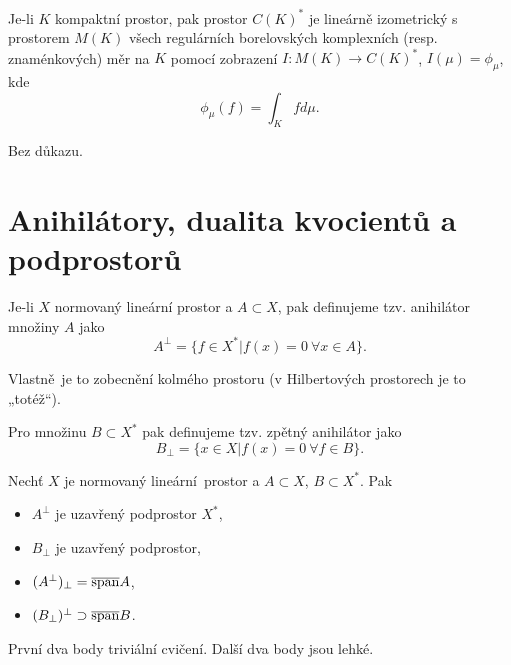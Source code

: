 \documentclass[12pt]{article}					%
\begin{document}
\begin{veta}
	Je-li $K$ kompaktní prostor, pak prostor $C(K)^*$ je lineárně izometrický s prostorem $M(K)$ všech regulárních borelovských komplexních (resp. znaménkových) měr na $K$ pomocí zobrazení $I: M(K) \rightarrow C(K)^*$, $I(\mu) = \phi_\mu$, kde
	$$ \phi_{\mu}(f) = \int_K f d\mu. $$

	\begin{dukazin}
		Bez důkazu.
	\end{dukazin}
\end{veta}

\section{Anihilátory, dualita kvocientů a podprostorů}
\begin{definice}
	Je-li $X$ normovaný lineární prostor a $A \subset X$, pak definujeme tzv. anihilátor množiny $A$ jako
	$$ A^\perp = \{f \in X^* | f(x) = 0\ \forall x \in A\}. $$

	\begin{poznamka}
		Vlastně je to zobecnění kolmého prostoru (v Hilbertových prostorech je to „totéž“).
	\end{poznamka}

	Pro množinu $B \subset X^*$ pak definujeme tzv. zpětný anihilátor jako
	$$ B_\perp = \{x \in X | f(x) = 0\ \forall f \in B\}. $$
\end{definice}

\begin{lemma}
	Nechť $X$ je normovaný lineární prostor a $A \subset X$, $B \subset X^*$. Pak

	\begin{itemize}
		\item $A^\perp$ je uzavřený podprostor $X^*$,
		\item $B_\perp$ je uzavřený podprostor,
		\item $(A^\perp)_\perp = \overline{\operatorname{span}}A$,
		\item $(B_\perp)^\perp \supset \overline{\operatorname{span}}B$.
	\end{itemize}

	\begin{dukazin}
		První dva body triviální cvičení. Další dva body jsou lehké.
	\end{dukazin}
\end{lemma}
\end{document}
